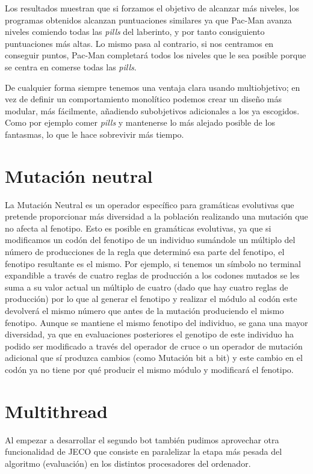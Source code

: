 Los resultados muestran que si forzamos el objetivo de alcanzar más niveles, los programas obtenidos alcanzan puntuaciones similares ya que Pac-Man avanza niveles comiendo todas las \textit{pills} del laberinto, y por tanto consiguiento puntuaciones más altas. Lo mismo pasa al contrario, si nos centramos en conseguir puntos, Pac-Man completará todos los niveles que le sea posible porque se centra en comerse todas las \textit{pills}.
 
De cualquier forma siempre tenemos una ventaja clara usando multiobjetivo; en vez de definir un comportamiento monolítico podemos crear un diseño más modular, más fácilmente, añadiendo subobjetivos adicionales a los ya escogidos. Como por ejemplo comer \textit{pills} y mantenerse lo más alejado posible de los fantasmas, lo que le hace sobrevivir más tiempo.

\section{Mutación neutral}
La Mutación Neutral es un operador específico para gramáticas evolutivas \cite{oesch2015neutral} que pretende proporcionar más diversidad a la población realizando una mutación que no afecta al fenotipo. Esto es posible en gramáticas evolutivas, ya que si modificamos un codón del fenotipo de un individuo sumándole un múltiplo del número de producciones de la regla que determinó esa parte del fenotipo, el fenotipo resultante es el mismo. Por ejemplo, si tenemos un símbolo no terminal expandible a través de cuatro reglas de producción a los codones mutados se les suma a su valor actual un múltiplo de cuatro (dado que hay cuatro reglas de producción) por lo que al generar el fenotipo y realizar el módulo al codón este devolverá el mismo número que antes de la mutación produciendo el mismo fenotipo.
Aunque se mantiene el mismo fenotipo del individuo, se gana una mayor diversidad, ya que en evaluaciones posteriores el genotipo de este individuo ha podido ser modificado a través del operador de cruce o un operador de mutación adicional que sí produzca cambios (como Mutación bit a bit) y este cambio en el codón ya no tiene por qué producir el mismo módulo y modificará el fenotipo.


\section{Multithread}
Al empezar a desarrollar el segundo bot también pudimos aprovechar otra funcionalidad de JECO que consiste en paralelizar la etapa más pesada del algoritmo (evaluación) en los distintos procesadores del ordenador.

